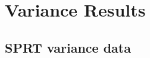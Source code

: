 
\chapter{Variance Results}\label{app-results-variance}

\section{SPRT variance data}\label{app-var-spr}



